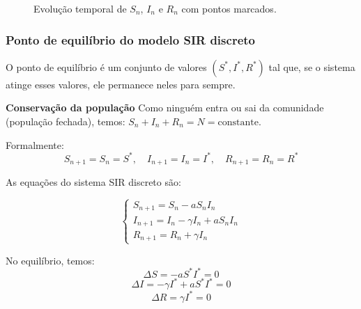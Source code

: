 \documentclass{article}
\begin{document}
\begin{figure}[ht]
\begin{subfigure}{0.3\textwidth}
    \centering
  \end{subfigure}
  
  \caption{Evolução temporal de $S_n$, $I_n$ e $R_n$ com pontos
    marcados.}
\end{figure}

\subsubsection{Ponto de equilíbrio do modelo SIR discreto}

O ponto de equilíbrio é um conjunto de valores $(S^*, I^*, R^*)$ tal
que, se o sistema atinge esses valores, ele permanece neles para
sempre.

\noindent\textbf{Conservação da população} Como ninguém entra ou sai da
comunidade (população fechada), temos:
$S_n+I_n+R_n=N=\text{constante}$.

Formalmente:
\[
S_{n+1} = S_n = S^*, \quad I_{n+1} = I_n = I^*, \quad R_{n+1} = R_n = R^*
\]

As equações do sistema SIR discreto são:

\[
\begin{cases}
S_{n+1} = S_n - a S_n I_n \\
I_{n+1} = I_n - \gamma I_n + a S_n I_n \\
R_{n+1} = R_n + \gamma I_n
\end{cases}
\]

No equilíbrio, temos:
\[
\Delta S = -a S^* I^* = 0
\]
\[
\Delta I = -\gamma I^* + a S^* I^* = 0
\]
\[
\Delta R = \gamma I^* = 0
\]
\end{document}
